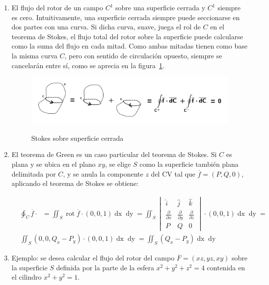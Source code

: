 \documentclass{article}
\begin{document}
\begin{enumerate}
\item El flujo del rotor de un campo $C^1$ sobre una superficie cerrada y $C^1$ siempre es cero. Intuitivamente, una superficie cerrada siempre puede seccionarse en dos partes con una curva. Si dicha curva, suave, juega el rol de $C$ en el teorema de Stokes, el flujo total del rotor sobre la superficie puede calcularse como la suma del flujo en cada mitad. Como ambas mitadas tienen como base la misma curva $C$, pero con sentido de circulación opuesto, siempre se cancelarán entre sí, como se aprecia en la figura~\ref{fig:stokes2}.

\begin{figure}[ht]
\centering
\caption{Stokes sobre superficie cerrada}
\includegraphics[scale=0.7]{img/teo_fig034_stokes.png}
\label{fig:stokes2}
\end{figure}

\item El teorema de Green es un caso particular del teorema de Stokes. Si $C$ es plana y se ubica en el plano $xy$, se elige $S$ como la superficie también plana delimitada por $C$, y se anula la componente $z$ del CV tal que $\overline{f} = (P, Q, 0)$, aplicando el teorema de Stokes se obtiene:

\begin{align}
& \ointctrclockwise_C \overline{f} \cdot \mathop{\overline{dC}} = \iint_S \mathop{rot} \overline{f} \cdot (0,0,1) \mathop{dx} \mathop{dy} = \iint_S \begin{vmatrix}
\hat{i} & \hat{j} & \hat{k} \\
\frac{\partial}{\partial x} & \frac{\partial}{\partial y} & \frac{\partial}{\partial z} \\
P & Q & 0
\end{vmatrix} \cdot (0,0,1) \mathop{dx} \mathop{dy} = \\
& \iint_S (0, 0, Q_x - P_y) \cdot (0,0,1) \mathop{dx} \mathop{dy} = \iint_S (Q_x - P_y) \mathop{dx} \mathop{dy} 
\end{align}

\item Ejemplo: se desea calcular el flujo del rotor del campo $\overline{F} = (xz, yz, xy)$ sobre la superficie $S$ definida por la parte de la esfera $x^2 + y^2 + z^2 = 4$ contenida en el cilindro $x^2 + y^2 = 1$.


\end{enumerate}
\end{document}
